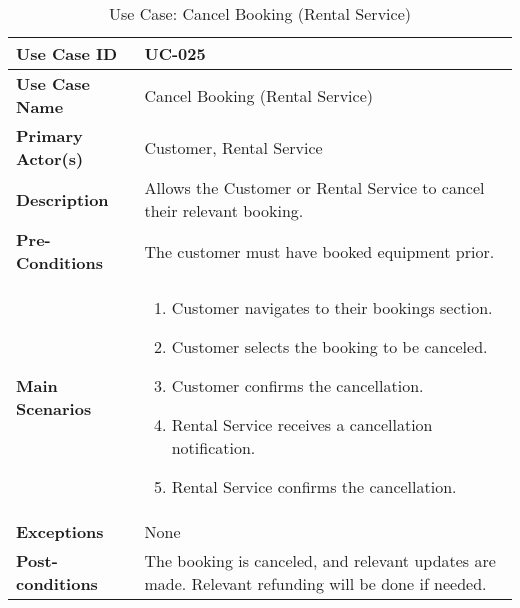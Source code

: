 \begin{table}[ht]
    \centering
    \begin{tabular}{|l|p{}|}
        \hline
        \textbf{Use Case ID} & UC-025 \\
        \hline
        \textbf{Use Case Name} & Cancel Booking (Rental Service) \\
        \hline
        \textbf{Primary Actor(s)} & Customer, Rental Service \\
        \hline
        \textbf{Description} & Allows the Customer or Rental Service to cancel their relevant booking. \\
        \hline
        \textbf{Pre-Conditions} & The customer must have booked equipment prior. \\
        \hline
        \textbf{Main Scenarios} & 
        \begin{enumerate}[label=\arabic*.,itemsep=0pt]
            \item Customer navigates to their bookings section.
            \item Customer selects the booking to be canceled.
            \item Customer confirms the cancellation.
            \item Rental Service receives a cancellation notification.
            \item Rental Service confirms the cancellation.
        \end{enumerate} \\
        \hline
        \textbf{Exceptions} & None \\
        \hline
        \textbf{Post-conditions} & The booking is canceled, and relevant updates are made. Relevant refunding will be done if needed. \\
        \hline
    \end{tabular}
    \label{tab:use-case-cancel-booking-rental-service}
    \caption{Use Case: Cancel Booking (Rental Service)}
\end{table}


